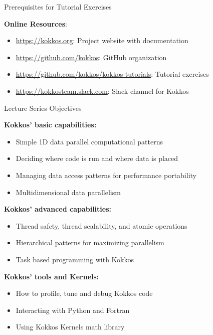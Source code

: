 \begin{frame}{Prerequisites for Tutorial Exercises}

\textbf{Online Resources}:

\begin{itemize}
	\item \url{https://kokkos.org}: Project website with documentation
	\item \url{https://github.com/kokkos}: GitHub organization
	\item \url{https://github.com/kokkos/kokkos-tutorials}: Tutorial exercises
	\item \url{https://kokkosteam.slack.com}: Slack channel for Kokkos
\end{itemize}

\end{frame}



\begin{frame}{Lecture Series Objectives}



  \textbf{Kokkos' basic capabilities:}
  \begin{itemize}
    \item {Simple 1D data parallel computational patterns}
    \item {Deciding where code is run and where data is placed}
    \item {Managing data access patterns for performance portability}
    \item {Multidimensional data parallelism}
  \end{itemize}


  \textbf{Kokkos' advanced capabilities:}
  \begin{itemize}
    \item {Thread safety, thread scalability, and atomic operations}
    \item {Hierarchical patterns for maximizing parallelism}
    \item {Task based programming with Kokkos}
  \end{itemize}


  \textbf{Kokkos' tools and Kernels:}
  \begin{itemize}
    \item {How to profile, tune and debug Kokkos code}
    \item {Interacting with Python and Fortran}
    \item {Using Kokkos Kernels math library}
  \end{itemize}

\end{frame}

